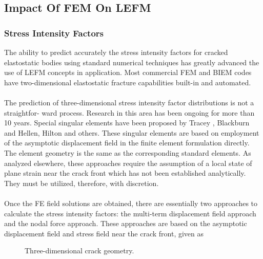 \documentclass[12pt]{article}
\begin{document}
\subsection{Impact Of FEM On LEFM}
\subsubsection{Stress Intensity Factors}
The ability to predict accurately the stress intensity factors for cracked elastostatic bodies using
standard numerical techniques has greatly advanced the use of LEFM concepts in application.
Most commercial
FEM and BIEM codes have two-dimensional elastostatic fracture capabilities built-in and
automated.
\\\\
The prediction of three-dimensional stress intensity factor distributions is not a straightfor-
ward process. Research in this area has been ongoing for more than 10 years. Special singular
elements have been proposed by Tracey , Blackburn and Hellen, Hilton and others. These
singular elements are based on employment of the asymptotic displacement field in the finite
element formulation directly. The element geometry is the same as the corresponding standard
elements. As analyzed elsewhere, these approaches require the assumption of a local state
of plane strain near the crack front which has not been established analytically. They must be
utilized, therefore, with discretion.
\\\\
Once the FE field solutions are obtained, there are essentially two approaches to calculate the
stress intensity factors: the multi-term displacement field approach and the nodal force
approach. These approaches are based on the asymptotic displacement field and stress field
near the crack front, given as
\begin{figure}[H]
    \centering
    \captionsetup{labelformat=empty}
    \caption{Three-dimensional crack geometry.}  
\end{figure}
\end{document}
